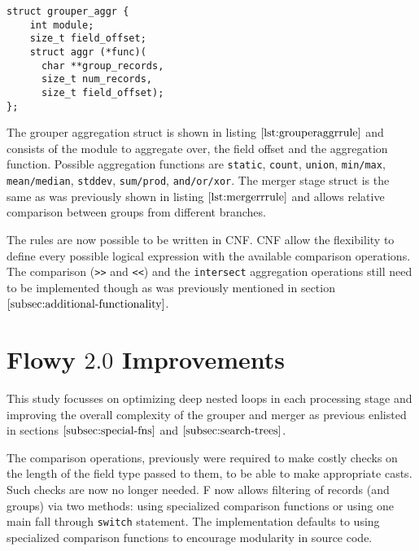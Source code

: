 \begin{lstlisting}
struct grouper_aggr {
	int module;
	size_t field_offset;
	struct aggr (*func)(
	  char **group_records,
	  size_t num_records,
	  size_t field_offset);
};
\end{lstlisting}

The grouper aggregation struct is shown in listing $\ref{lst:grouperaggrrule}$
and consists of the module to aggregate over, the field offset and the
aggregation function.  Possible
aggregation functions are \texttt{static}, \texttt{count}, \texttt{union},
\texttt{min/max}, \texttt{mean/median}, \texttt{stddev}, \texttt{sum/prod},
\texttt{and/or/xor}. The merger stage struct is the same as was previously
shown in listing $\ref{lst:mergerrrule}$ and allows relative comparison
between groups from different branches.

The rules are now possible to be written in \ac{CNF}. \ac{CNF} allow the
flexibility to define every possible logical expression with the available
comparison operations.  The comparison (\texttt{>>}
and \texttt{<<}) and the \texttt{intersect} aggregation operations still need
to be implemented though as was previously mentioned in section
$\ref{subsec:additional-functionality}$.

\section{Flowy $2.0$ Improvements}\label{sec:flowy-2-improvements}

This study focusses on optimizing deep nested loops in each processing stage
and improving the overall complexity of the grouper and merger as previous
enlisted in sections $\ref{subsec:special-fns}$ and
$\ref{subsec:search-trees}$.

The comparison operations, previously were required to make costly checks on
the length of the field type passed to them, to be able to make appropriate
casts. Such checks are now no longer needed. F now allows filtering of records
(and groups) via two methods: using specialized comparison functions or using
one main fall through \texttt{switch} statement. The implementation defaults
to using specialized comparison functions to encourage modularity in source
code.

